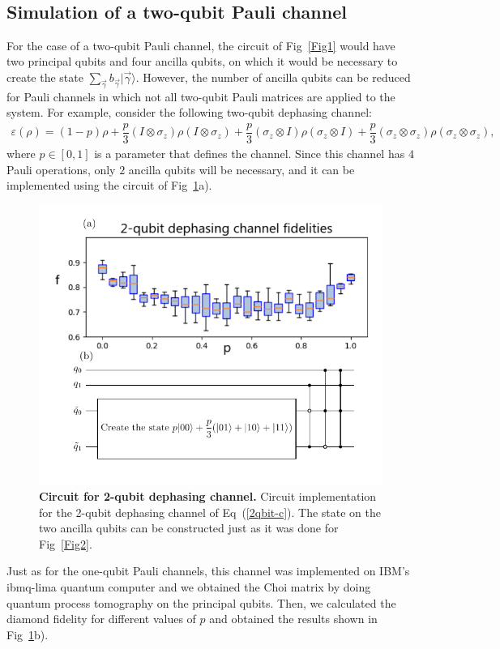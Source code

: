 \documentclass[10pt,letterpaper]{article} %
\newcommand{\fref}[1]{Fig~\ref{#1}}
\newcommand{\eref}[1]{Eq~(\ref{#1})}
\begin{document}
\\

{\color{green}
\subsection{Simulation of a two-qubit Pauli channel}


For the case of a two-qubit Pauli channel,
the circuit of \fref{Fig1} would have two principal
qubits and four ancilla qubits, on which it would be necessary to create the state $\sum_{\vec{\gamma}} b_{\vec{\gamma}} |\vec{\gamma}\rangle$.
However, the number of ancilla qubits can be reduced for Pauli 
channels in which not all two-qubit Pauli matrices are applied to
the system. For example, consider the following two-qubit dephasing channel:
\begin{align}
\varepsilon (\rho) = (1-p) \rho + \dfrac{p}{3} (I \otimes \sigma_z) \rho (I \otimes \sigma_z) +  \dfrac{p}{3}(\sigma_z \otimes I) \rho (\sigma_z \otimes I) +  \dfrac{p}{3}(\sigma_z \otimes \sigma_z) \rho (\sigma_z \otimes \sigma_z),
\label{2qbit-c}
\end{align}
where $p \in [0,1]$ is a parameter that defines the channel. 
Since this channel has $4$ Pauli operations, 
only $2$ ancilla qubits will be necessary, and it can be implemented
using the circuit of \fref{2qbit}a).

\begin{figure} %
\centering
\includegraphics{images/qbit-im.pdf}
\caption{{\bf Circuit for 2-qubit dephasing channel.}  Circuit implementation for the 2-qubit dephasing channel of \eref{2qbit-c}. The state on the two ancilla qubits can be constructed just as it was done for \fref{Fig2}. }
\label{2qbit}
\end{figure} %

Just as for the one-qubit Pauli channels, this 
channel was implemented on IBM's ibmq-lima  quantum computer and we obtained the Choi 
matrix by doing quantum process tomography on
the principal qubits. Then, we calculated the diamond fidelity for different values of $p$ and
obtained the results shown in \fref{2qbit}b).  

}
\end{document}

